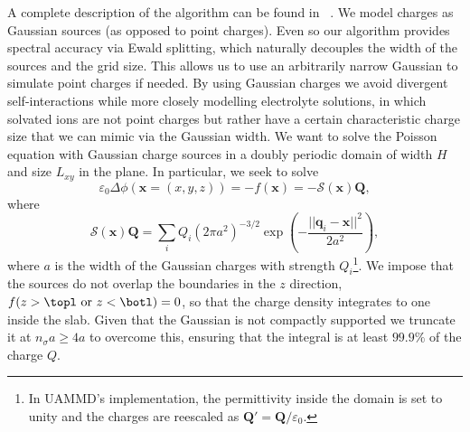 \documentclass[twoside,openright,titlepage,numbers=noenddot,%
headinclude,footinclude,cleardoublepage=empty,abstract=on,
BCOR=5mm,fontsize=11pt, dvipsnames, paper=b5
]{scrreprt}
\renewcommand{\vec}[1]{\bm{#1}}
\newcommand{\oper}[1]{\mathcal{#1}}
\newcommand{\uammd}{\gls{UAMMD}\xspace}
\newcommand{\ppos}{q}
\begin{document}
%
A complete description of the algorithm can be found in ~\cite{Maxian2021}.
We model charges as Gaussian sources (as opposed to point charges). Even so our algorithm provides spectral accuracy via Ewald splitting, which naturally decouples the width of the sources and the grid size. This allows us to use an arbitrarily narrow Gaussian to simulate point charges if needed. By using Gaussian charges we avoid divergent self-interactions while more closely modelling electrolyte solutions, in which solvated ions are not point charges but rather have a certain characteristic charge size that we can mimic via the Gaussian width.
We want to solve the Poisson equation with Gaussian charge sources in a doubly periodic domain of width $H$ and size $L_{xy}$ in the plane. In particular, we seek to solve
\begin{equation}\label{eq:dppoisson}
 \varepsilon_0\Delta\phi(\vec{x} = (x,y,z))=-f(\vec{x})=-\oper{S}(\vec{x})\vec{Q},
\end{equation}
where 
\begin{equation}\label{eq:dppoissongauss}
 \oper{S}(\vec{x})\vec{Q} = \sum_iQ_i\left(2\pi a^2\right)^{-3/2}\exp\left(-\frac{||\vec{\ppos}_i-\vec{x}||^2}{2a^2}\right),
\end{equation}
where $a$ is the width of the Gaussian charges with strength $Q_i$\footnote{In \uammd's implementation, the permittivity inside the domain is set to unity and the charges are reescaled as $\vec{Q}' = \vec{Q}/\varepsilon_0$.}.
We impose that the sources do not overlap the boundaries in the $z$ direction, $f(z>\topl \text{ or } z<\botl) = 0$, so that the charge density integrates to one inside the slab. Given that the Gaussian is not compactly supported we truncate it at $n_\sigma a \ge 4 a$ to overcome this, ensuring that the integral is at least $99.9\%$ of the charge $Q$.
\end{document}
